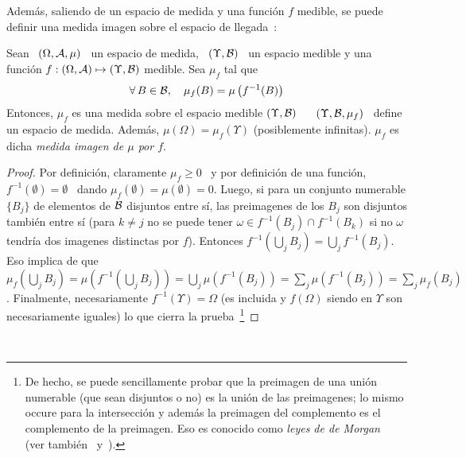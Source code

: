 Adem\'as, saliendo de un espacio de medida y una funci\'on $f$ medible, se puede
definir una medida imagen  sobre el espacio de llegada~\cite{AthLah06, Bog07:v1,
  Coh13}:
%
\begin{teorema}\label{th:MP:MedidaImagen}
  Sean  \ $(\Omega,\mathcal{A},\mu)$  \  un espacio  de  medida, \  $(\Upsilon,\mathcal{B})$ \  un
  espacio  medible  y  una  funci\'on  $f:  (\Omega,\mathcal{A})  \mapsto  (\Upsilon,\mathcal{B})$
  medible. Sea $\mu_f$ tal que
  \[
  \forall \,  B \in  \mathcal{B}, \quad  \mu_f(B) = \mu\left( f^{-1}(B) \right)
  \]
  Entonces, $\mu_f$ es una medida sobre el espacio medible $(\Upsilon,\mathcal{B})$ \ \ie
  \ $(\Upsilon,\mathcal{B},\mu_f)$ \ define un espacio de medida.  Adem\'as, $\mu(\Omega)
  =  \mu_f(\Upsilon)$ (posiblemente  infinitas).  $\mu_f$ es  dicha {\it  medida
    imagen de $\mu$ por $f$}.
\end{teorema}
%
\begin{proof}
  Por  definici\'on,  claramente $\mu_f  \ge  0$ \  y  por  definici\'on de  una
  funci\'on,  $f^{-1}(\emptyset)  =   \emptyset$  \  dando  $\mu_f(\emptyset)  =
  \mu(\emptyset) =  0$.  Luego,  si para  un conjunto numerable  $\{ B_j  \}$ de
  elementos  de $\mathcal{B}$  disjuntos entre  s\'i, las  preimagenes de  los  $B_j$ son
  disjuntos tambi\'en entre  s\'i (para $k \ne j$ no se  puede tener $\omega \in
  f^{-1}(B_j) \cap f^{-1}(B_k)$ si no $\omega$ tendr\'ia dos imagenes distinctas
  por  $f$).   Entonces  $\displaystyle  f^{-1}\left( \bigcup_j  B_j  \right)  =
  \bigcup_j  f^{-1}(B_j)$.   Eso   implica  de  que  $\displaystyle  \mu_f\left(
    \bigcup_j B_j \right) = \mu\left( f^{-1}\left( \bigcup_j B_j \right) \right)
  =  \bigcup_j  \mu\left( f^{-1}(B_j)  \right)  =  \sum_j \mu\left(  f^{-1}(B_j)
  \right) = \sum_j  \mu_f(B_j)$.  Finalmente, necesariamente $f^{-1}(\Upsilon) =
  \Omega$  (es incluida y  $f(\Omega)$ siendo  en $\Upsilon$  son necesariamente
  iguales) lo  que cierra la  prueba~\footnote{De hecho, se  puede sencillamente
    probar que la  preimagen de una uni\'on numerable (que  sean disjuntos o no)
    es la uni\'on  de las preimagenes; lo mismo occure  para la intersecci\'on y
    adem\'as la  preimagen del  complemento es el  complemento de  la preimagen.
    Eso  es  conocido  como  {\it  leyes de  de  Morgan}~\cite{AthLah06,  Coh13,
      HogMck13}              (ver              tambi\'en~\cite[Cap.~1]{KolFom57}
    y~\cite[Caps.~5~\&~6]{KolFom61}).}
\end{proof}

\

